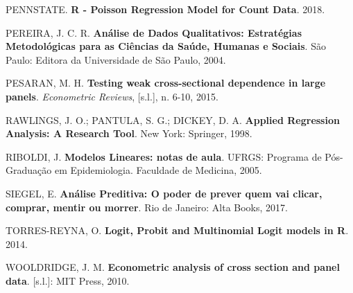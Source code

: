 \documentclass[12pt,brazil,oneside]{book}
\begin{document}
\leavevmode\hypertarget{ref-penn2018}{}%
PENNSTATE. \textbf{R - Poisson Regression Model for Count Data}. 2018.

\leavevmode\hypertarget{ref-Pereira2004}{}%
PEREIRA, J. C. R. \textbf{Análise de Dados Qualitativos: Estratégias Metodológicas para as Ciências da Saúde, Humanas e Sociais}. São Paulo: Editora da Universidade de São Paulo, 2004.

\leavevmode\hypertarget{ref-pesaran2015}{}%
PESARAN, M. H. \textbf{Testing weak cross-sectional dependence in large panels}. \emph{Econometric Reviews}, {[}s.l.{]}, n. 6-10, 2015.

\leavevmode\hypertarget{ref-Rawlings1998}{}%
RAWLINGS, J. O.; PANTULA, S. G.; DICKEY, D. A. \textbf{Applied Regression Analysis: A Research Tool}. New York: Springer, 1998.

\leavevmode\hypertarget{ref-Riboldi2005}{}%
RIBOLDI, J. \textbf{Modelos Lineares: notas de aula}. UFRGS: Programa de Pós-Graduação em Epidemiologia. Faculdade de Medicina, 2005.

\leavevmode\hypertarget{ref-Siegel2017}{}%
SIEGEL, E. \textbf{Análise Preditiva: O poder de prever quem vai clicar, comprar, mentir ou morrer}. Rio de Janeiro: Alta Books, 2017.

\leavevmode\hypertarget{ref-Torres-Reyna2014}{}%
TORRES-REYNA, O. \textbf{Logit, Probit and Multinomial Logit models in R}. 2014.

\leavevmode\hypertarget{ref-wooldridge2010}{}%
WOOLDRIDGE, J. M. \textbf{Econometric analysis of cross section and panel data}. {[}s.l.{]}: MIT Press, 2010.
\end{document}
